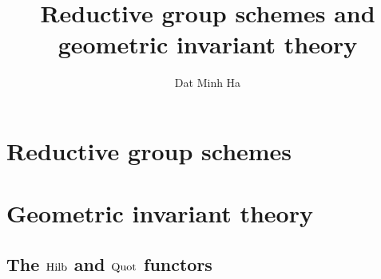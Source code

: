 

\setcounter{section}{-1}





	\title{Reductive group schemes and geometric invariant theory}
	
	\author{Dat Minh Ha}
	\maketitle
	
	{
      \hypersetup{} 
      \tableofcontents %
    }
    
    
    
    \chapter{Reductive group schemes}
        
        
        
        
        
        
        
   
    \chapter{Geometric invariant theory}
    
    \begin{appendices}
        \chapter{The \texorpdfstring{$\mathrm{Hilb}$}{} and \texorpdfstring{$\mathrm{Quot}$}{} functors}
            
            
            
            
            
    \end{appendices}
	
	\printbibliography

